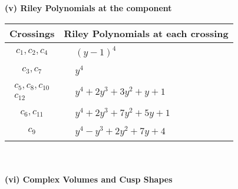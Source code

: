 \documentclass[1p]{elsarticle_modified}
\theoremstyle{definition}
\begin{document}
\newpage\renewcommand{\arraystretch}{1}
\flushleft \textbf{(v) Riley Polynomials at the component}\newline \\
\begin{tabular}{m{50pt}|m{274pt}}
Crossings & \hspace{64pt}Riley Polynomials at each crossing \\
\hline $$\begin{aligned}c_{1},c_{2},c_{4}\end{aligned}$$&$\begin{aligned}
&(y-1)^4
\end{aligned}$\\
\hline $$\begin{aligned}c_{3},c_{7}\end{aligned}$$&$\begin{aligned}
&y^4
\end{aligned}$\\
\hline $$\begin{aligned}c_{5},c_{8},c_{10}\\c_{12}\end{aligned}$$&$\begin{aligned}
&y^4+2 y^3+3 y^2+y+1
\end{aligned}$\\
\hline $$\begin{aligned}c_{6},c_{11}\end{aligned}$$&$\begin{aligned}
&y^4+2 y^3+7 y^2+5 y+1
\end{aligned}$\\
\hline $$\begin{aligned}c_{9}\end{aligned}$$&$\begin{aligned}
&y^4- y^3+2 y^2+7 y+4
\end{aligned}$\\
\hline
\end{tabular}\\~\\
\newpage\flushleft \textbf{(vi) Complex Volumes and Cusp Shapes}
\end{document}
